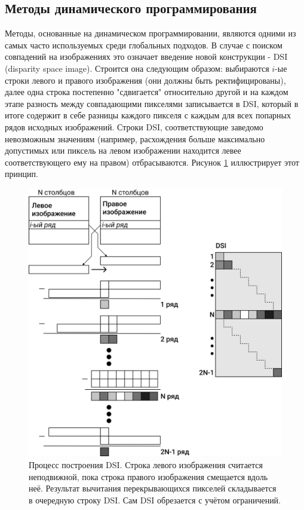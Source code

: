 \subsection{Методы динамического программирования}
Методы, основанные на динамическом программировании, являются одними из самых часто используемых среди глобальных подходов.  
В случае с поиском совпадений на изображениях это означает введение новой конструкции - DSI (disparity space image). Строится она следующим образом: 
выбираются $i$-ые строки левого и правого изображения (они должны быть ректифицированы), далее одна строка постепенно "сдвигается" относительно другой и
на каждом этапе разность между совпадающими пикселями записывается в DSI, который в итоге содержит в себе разницы каждого пикселя с каждым для всех попарных
 рядов исходных изображений. Строки DSI, соответствующие заведомо невозможным значениям (например, расхождения больше максимально допустимых или пиксель на левом изображении 
 находится левее соответствующего ему на правом) отбрасываются. 
Рисунок \ref{pic:DSI} \cite{DSI} иллюстрирует этот принцип. 
\begin{figure}[H]
	\begin{center}
		\includegraphics[scale=0.04]{pics/DSI_rus.png}
		\caption{Процесс построения DSI. Строка левого изображения считается неподвижной, пока строка правого изображения смещается вдоль неё. Результат вычитания 
				 перекрывающихся пикселей складывается в очередную строку DSI. Сам DSI обрезается с учётом ограничений.	} 
		\label{pic:DSI} %
	\end{center}
\end{figure}

